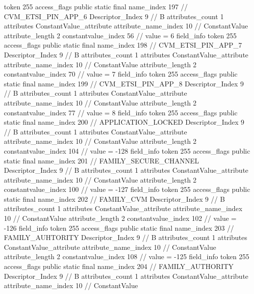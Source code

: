 {{{{{				token	255
				access_flags	public static final
				name_index	197		// CVM_ETSI_PIN_APP_6
				Descriptor_Index	9		// B
				attributes_count	1
				attributes {
				ConstantValue_attribute {
					attribute_name_index	10		// ConstantValue
					attribute_length	2
					constantvalue_index	56		// value = 6
				}
				}
			}
			field_info {
				token	255
				access_flags	public static final
				name_index	198		// CVM_ETSI_PIN_APP_7
				Descriptor_Index	9		// B
				attributes_count	1
				attributes {
				ConstantValue_attribute {
					attribute_name_index	10		// ConstantValue
					attribute_length	2
					constantvalue_index	70		// value = 7
				}
				}
			}
			field_info {
				token	255
				access_flags	public static final
				name_index	199		// CVM_ETSI_PIN_APP_8
				Descriptor_Index	9		// B
				attributes_count	1
				attributes {
				ConstantValue_attribute {
					attribute_name_index	10		// ConstantValue
					attribute_length	2
					constantvalue_index	77		// value = 8
				}
				}
			}
			field_info {
				token	255
				access_flags	public static final
				name_index	200		// APPLICATION_LOCKED
				Descriptor_Index	9		// B
				attributes_count	1
				attributes {
				ConstantValue_attribute {
					attribute_name_index	10		// ConstantValue
					attribute_length	2
					constantvalue_index	104		// value = -128
				}
				}
			}
			field_info {
				token	255
				access_flags	public static final
				name_index	201		// FAMILY_SECURE_CHANNEL
				Descriptor_Index	9		// B
				attributes_count	1
				attributes {
				ConstantValue_attribute {
					attribute_name_index	10		// ConstantValue
					attribute_length	2
					constantvalue_index	100		// value = -127
				}
				}
			}
			field_info {
				token	255
				access_flags	public static final
				name_index	202		// FAMILY_CVM
				Descriptor_Index	9		// B
				attributes_count	1
				attributes {
				ConstantValue_attribute {
					attribute_name_index	10		// ConstantValue
					attribute_length	2
					constantvalue_index	102		// value = -126
				}
				}
			}
			field_info {
				token	255
				access_flags	public static final
				name_index	203		// FAMILY_AUHTORITY
				Descriptor_Index	9		// B
				attributes_count	1
				attributes {
				ConstantValue_attribute {
					attribute_name_index	10		// ConstantValue
					attribute_length	2
					constantvalue_index	108		// value = -125
				}
				}
			}
			field_info {
				token	255
				access_flags	public static final
				name_index	204		// FAMILY_AUTHORITY
				Descriptor_Index	9		// B
				attributes_count	1
				attributes {
				ConstantValue_attribute {
					attribute_name_index	10		// ConstantValue
}}}}}}}
